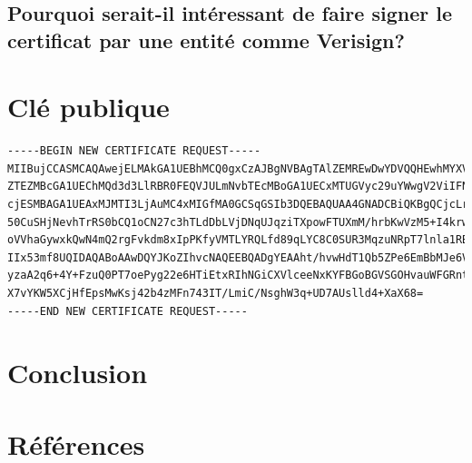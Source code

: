 \documentclass[10pt,a4paper,titlepage]{article}
\begin{document}
\subsection{Pourquoi serait-il intéressant de faire signer le certificat par une entité comme Verisign?}

\section{Clé publique}

\scriptsize{
\begin{verbatim}
-----BEGIN NEW CERTIFICATE REQUEST-----
MIIBujCCASMCAQAwejELMAkGA1UEBhMCQ0gxCzAJBgNVBAgTAlZEMREwDwYDVQQHEwhMYXVzYW5u
ZTEZMBcGA1UEChMQd3d3LlRBR0FEQVJULmNvbTEcMBoGA1UECxMTUGVyc29uYWwgV2ViIFNlcnZl
cjESMBAGA1UEAxMJMTI3LjAuMC4xMIGfMA0GCSqGSIb3DQEBAQUAA4GNADCBiQKBgQCjcLrCVl/h
50CuSHjNevhTrRS0bCQ1oCN27c3hTLdDbLVjDNqUJqziTXpowFTUXmM/hrbKwVzM5+I4krwx/6dW
oVVhaGywxkQwN4mQ2rgFvkdm8xIpPKfyVMTLYRQLfd89qLYC8C0SUR3MqzuNRpT7lnla1RB9A6Mg
IIx53mf8UQIDAQABoAAwDQYJKoZIhvcNAQEEBQADgYEAAht/hvwHdT1Qb5ZPe6EmBbMJe6VozqQT
yzaA2q6+4Y+FzuQ0PT7oePyg22e6HTiEtxRIhNGiCXVlceeNxKYFBGoBGVSGOHvauWFGRntErntQ
X7vYKW5XCjHfEpsMwKsj42b4zMFn743IT/LmiC/NsghW3q+UD7AUslld4+XaX68=
-----END NEW CERTIFICATE REQUEST-----
\end{verbatim}
}

\section{Conclusion}



\section{Références}
\end{document}
